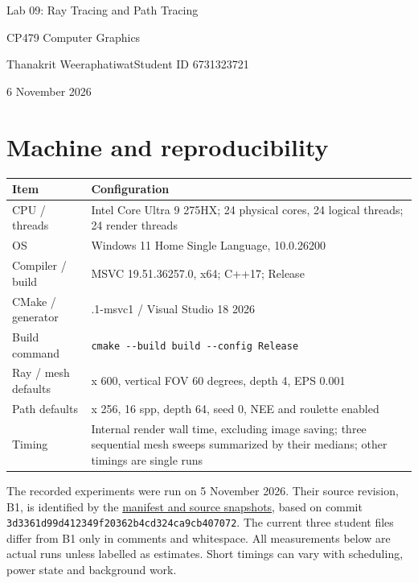 \documentclass[11pt,a4paper]{article}
\begin{document}
\begin{center}
{\Large Lab 09: Ray Tracing and Path Tracing}\par\medskip
CP479 Computer Graphics\par
Thanakrit Weeraphatiwat\quad Student ID 6731323721\par
6 November 2026
\end{center}
\vspace{2mm}
\section{Machine and reproducibility}
\begin{center}\small\setlength{\tabcolsep}{4pt}\renewcommand{\arraystretch}{1.14}
\begin{tabular}{>{\raggedright\arraybackslash}p{}>{\raggedright\arraybackslash}p{}}
\toprule
\textbf{Item} & \textbf{Configuration} \\
\midrule
CPU /\allowbreak{} threads & Intel Core Ultra 9 275HX; 24 physical cores, 24 logical threads; 24 render threads \\
OS & Windows 11 Home Single Language, 10.0.26200 \\
Compiler /\allowbreak{} build & MSVC 19.51.36257.0, x64; C++17; Release \\
CMake /\allowbreak{} generator & 4.3.1-msvc1 /\allowbreak{} Visual Studio 18 2026 \\
Build command & \texttt{cmake -{}-build build -{}-config Release} \\
Ray /\allowbreak{} mesh defaults & 800 x 600, vertical FOV 60 degrees, depth 4, EPS 0.001 \\
Path defaults & 256 x 256, 16 spp, depth 64, seed 0, NEE and roulette enabled \\
Timing & Internal render wall time, excluding image saving; three sequential mesh sweeps summarized by their medians; other timings are single runs \\
\bottomrule\end{tabular}
\end{center}

The recorded experiments were run on 5 November 2026. Their source revision, B1, is identified by the \href{https://github.com/Champy2005/Lab09-RayTracing/blob/main/evidence/data/session-manifest.json}{manifest and source snapshots}, based on commit \texttt{3d3361d9\allowbreak{}9d412349\allowbreak{}f20362b4\allowbreak{}cd324ca9\allowbreak{}cb407072}. The current three student files differ from B1 only in comments and whitespace. All measurements below are actual runs unless labelled as estimates. Short timings can vary with scheduling, power state and background work.
\end{document}
